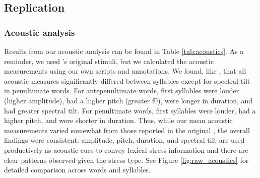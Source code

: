 \subsection{Replication}

\subsubsection{Acoustic analysis}
Results from our acoustic analysis can be found in Table \ref{tab:acoustics}. As a reminder, we used \cite{Sulpizio_McQueen_2012}'s original stimuli, but we calculated the acoustic measurements using our own scripts and annotations. We found, like \cite{Sulpizio_McQueen_2012}, that all acoustic measures significantly differed between syllables except for spectral tilt in penultimate words. For antepenultimate words, first syllables were louder (higher amplitude), had a higher pitch (greater f0), were longer in duration, and had greater spectral tilt. For penultimate words, first syllables were louder, had a higher pitch, and were shorter in duration. Thus, while our mean acoustic measurements varied somewhat from those reported in the original \cite{Sulpizio_McQueen_2012}, the overall findings were consistent: amplitude, pitch, duration, and spectral tilt are used productively as acoustic cues to convey lexical stress information and there are clear patterns observed given the stress type. See Figure \ref{fig:raw_acoustics} for detailed comparison across words and syllables. 

